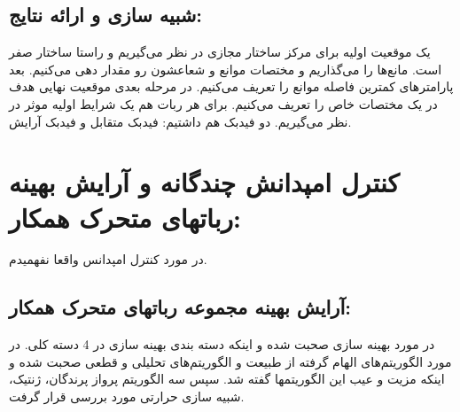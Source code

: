 \subsection{شبیه سازی و ارائه نتایج:}
یک موقعیت اولیه برای مرکز ساختار مجازی در نظر می‌گیریم و راستا ساختار صفر است.
مانع‌ها را می‌گذاریم و مختصات موانع و شعاعشون رو مقدار دهی می‌کنیم.
بعد پارامترهای کمترین فاصله موانع را تعریف می‌کنیم. در مرحله بعدی موقعیت نهایی هدف در یک مختصات خاص را تعریف می‌کنیم.
برای هر ربات هم یک شرایط اولیه موثر در نظر می‌گیریم.
دو فیدبک هم داشتیم: فیدبک متقابل و فیدبک آرایش.

\section{کنترل امپدانش چندگانه و آرایش بهینه رباتهای متحرک همکار:}

در مورد کنترل امپدانس واقعا نفهمیدم.

\subsection{آرایش بهینه مجموعه رباتهای متحرک همکار:}
در مورد بهینه سازی صحبت شده و اینکه دسته بندی بهینه سازی در 4 دسته کلی. در مورد الگوریتم‌های الهام گرفته از طبیعت و الگوریتم‌های تحلیلی و قطعی صحبت شده و اینکه مزیت و عیب این الگوریتمها گفته شد. سپس سه الگوریتم پرواز پرندگان، ژنتیک، شبیه سازی حرارتی مورد بررسی قرار گرفت.



